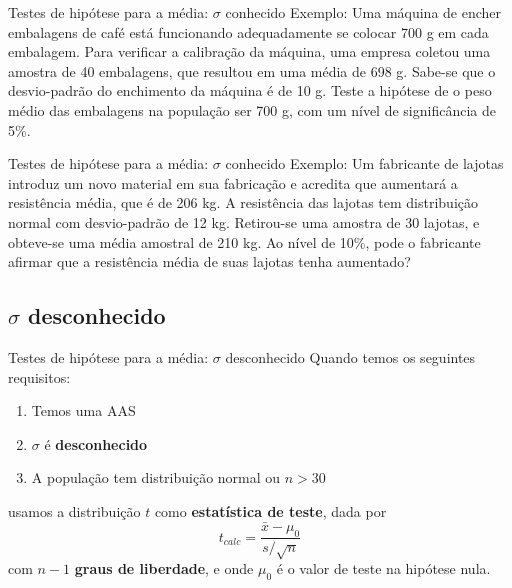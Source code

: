 \documentclass[10pt]{beamer}\usepackage[]{graphicx}\usepackage[]{color}
\theoremstyle{definition}
\begin{document}
\begin{frame}{Testes de hipótese para a média: $\sigma$ conhecido}
  Exemplo: Uma máquina de encher embalagens de café está funcionando
  adequadamente se colocar 700 g em cada embalagem. Para verificar a
  calibração da máquina, uma empresa coletou uma amostra de 40
  embalagens, que resultou em uma média de 698 g. Sabe-se que o
  desvio-padrão do enchimento da máquina é de 10 g. Teste a hipótese de
  o peso médio das embalagens na população ser 700 g, com um nível de
  significância de 5\%.
\end{frame}

\begin{frame}{Testes de hipótese para a média: $\sigma$ conhecido}
  Exemplo: Um fabricante de lajotas introduz um novo material em sua
  fabricação e acredita que aumentará a resistência média, que é de 206
  kg. A resistência das lajotas tem distribuição normal com
  desvio-padrão de 12 kg. Retirou-se uma amostra de 30 lajotas, e
  obteve-se uma média amostral de 210 kg. Ao nível de 10\%, pode o
  fabricante afirmar que a resistência média de suas lajotas tenha
  aumentado?
\end{frame}

\subsection[$\sigma$ desconhe.]{$\sigma$ desconhecido}

\begin{frame}{Testes de hipótese para a média: $\sigma$ desconhecido}
  Quando temos os seguintes requisitos:
  \begin{enumerate}
  \item Temos uma AAS
  \item $\sigma$ é \textbf{desconhecido}
  \item A população tem distribuição normal ou $n>30$
  \end{enumerate}
  usamos a distribuição $t$ como \textbf{estatística de teste}, dada por
  \begin{equation*}
    t_{calc} = \frac{\bar{x} - \mu_0}{s/\sqrt{n}}
  \end{equation*}
  com $n-1$ \textbf{graus de liberdade}, e onde $\mu_0$ é o valor de
  teste na hipótese nula.
\end{frame}
\end{document}
